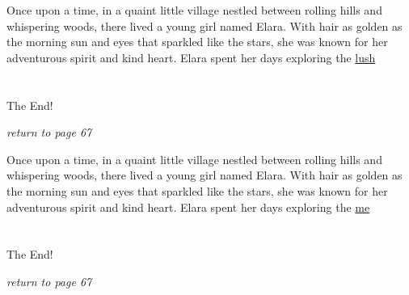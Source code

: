 \documentclass{memoir}
\begin{document}
        


        \hspace{1cm}\vfill
        \begin{minipage}{3in}
        \LARGE
        Once upon a time, in a quaint little village nestled between rolling hills and whispering woods, there lived a young girl named Elara. With hair as golden as the morning sun and eyes that sparkled like the stars, she was known for her adventurous spirit and kind heart. Elara spent her days exploring the \ul{lush}\\ \vspace{5mm} \\
 \\\vspace{1cm} The End! \\ 

        \hspace{1cm}\begin{minipage}{6cm}
        \normalsize
            \hfill \textit{return to page 67}
        \end{minipage} 
        \end{minipage}
        \hspace{1cm}\vfill
        \cleardoublepage

        


        \hspace{1cm}\vfill
        \begin{minipage}{3in}
        \LARGE
        Once upon a time, in a quaint little village nestled between rolling hills and whispering woods, there lived a young girl named Elara. With hair as golden as the morning sun and eyes that sparkled like the stars, she was known for her adventurous spirit and kind heart. Elara spent her days exploring the \ul{me}\\ \vspace{5mm} \\
 \\\vspace{1cm} The End! \\ 

        \hspace{1cm}\begin{minipage}{6cm}
        \normalsize
            \hfill \textit{return to page 67}
        \end{minipage} 
        \end{minipage}
        \hspace{1cm}\vfill
        \cleardoublepage
\end{document}

